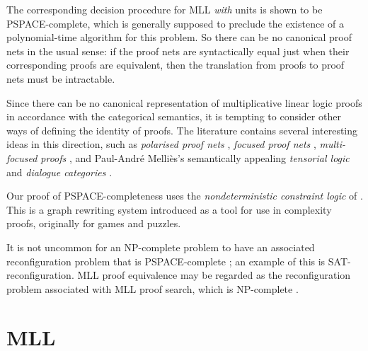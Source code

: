 \documentclass{lmcs}
\let\capsabbrev=\uppercase
\begin{document}
The corresponding decision procedure for \capsabbrev{mll} \emph{with} units is shown to be
\capsabbrev{pspace}-complete, which is generally supposed to preclude the existence of a
polynomial-time algorithm for this problem. So there can be no canonical proof nets in the
usual sense: if the proof nets are syntactically equal just when their corresponding proofs
are equivalent, then the translation from proofs to proof nets must be intractable.


Since there can be no canonical representation of multiplicative linear logic proofs in accordance with the categorical semantics, it is tempting to consider other ways of defining the identity of proofs. The literature contains several interesting ideas in this direction, such as \emph{polarised proof nets} \cite{Laurent-1999}, \emph{focused proof nets} \cite{Andreoli-Maieli-1999}, \emph{multi-focused proofs} \cite{Chaudhuri-Miller-Saurin-2008}, and Paul-Andr\'e Melli\`es's semantically appealing \emph{tensorial logic} and \emph{dialogue categories} \cite{Mellies-2012}.

Our proof of \capsabbrev{pspace}-completeness uses the \emph{nondeterministic constraint logic} of \cite{Hearn-Demaine-2005,Demaine-Hearn-2008,GamesPuzzlesAndComputation}. This is a graph rewriting
system introduced as a tool for use in complexity proofs, originally for games and puzzles.

It is not uncommon for an \capsabbrev{np}-complete problem to have an associated reconfiguration problem that is \capsabbrev{pspace}-complete \cite{ReconfigurationProblems}; an example of this is \capsabbrev{sat}-reconfiguration. \capsabbrev{mll} proof equivalence may be regarded as the reconfiguration problem associated with \capsabbrev{mll} proof search, which is \capsabbrev{np}-complete \cite{Kanovich-1992,Lincoln-Winkler-1994}.




\section{\protect\capsabbrev{mll}}
\end{document}
